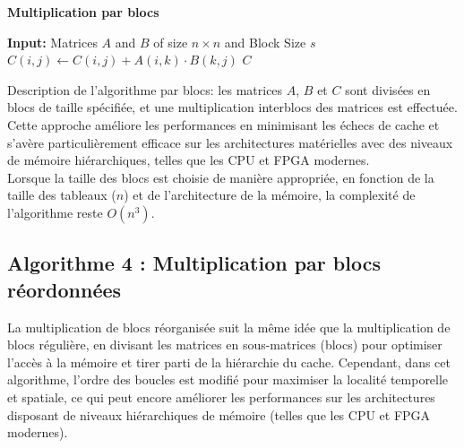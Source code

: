 \documentclass[../CSC_5RO06_TA.tex]{subfiles}
\begin{document}
\begin{algorithm}
\caption{\textbf{Multiplication par blocs}}
\begin{algorithmic}[1]
    \State \textbf{Input:} Matrices $A$ and $B$ of size $n \times n$ and Block Size $s$
                            \State $C(i,j) \gets C(i,j) + A(i,k) \cdot B(k,j)$
                        \EndFor
                    \EndFor
                \EndFor
            \EndFor
        \EndFor
    \EndFor
    \State \Return $C$
\end{algorithmic}
\end{algorithm}

Description de l'algorithme par blocs: les matrices $A$, $B$ et $C$ sont divisées en blocs de taille spécifiée, et une multiplication interblocs des matrices est effectuée. Cette approche améliore les performances en minimisant les échecs de cache et s'avère particulièrement efficace sur les architectures matérielles avec des niveaux de mémoire hiérarchiques, telles que les CPU et FPGA modernes.\\

Lorsque la taille des blocs est choisie de manière appropriée, en fonction de la taille des tableaux ($n$) et de l'architecture de la mémoire, la complexité de l'algorithme reste $O(n^3)$.


\subsection{Algorithme 4 : Multiplication par blocs réordonnées}

La multiplication de blocs réorganisée suit la même idée que la multiplication de blocs régulière, en divisant les matrices en sous-matrices (blocs) pour optimiser l'accès à la mémoire et tirer parti de la hiérarchie du cache. Cependant, dans cet algorithme, l'ordre des boucles est modifié pour maximiser la localité temporelle et spatiale, ce qui peut encore améliorer les performances sur les architectures disposant de niveaux hiérarchiques de mémoire (telles que les CPU et FPGA modernes).\\
\end{document}
